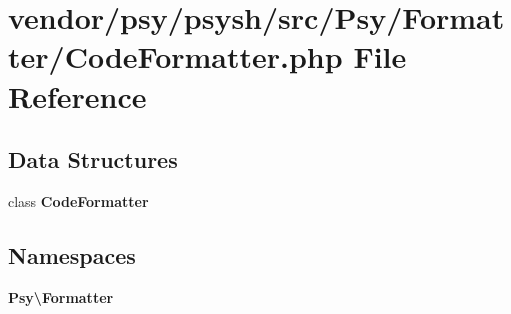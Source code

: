 \section{vendor/psy/psysh/src/\+Psy/\+Formatter/\+Code\+Formatter.php File Reference}
\label{_code_formatter_8php}
\subsection*{Data Structures}
\begin{DoxyCompactItemize}
\item 
class {\bf Code\+Formatter}
\end{DoxyCompactItemize}
\subsection*{Namespaces}
\begin{DoxyCompactItemize}
\item 
 {\bf Psy\textbackslash{}\+Formatter}
\end{DoxyCompactItemize}
